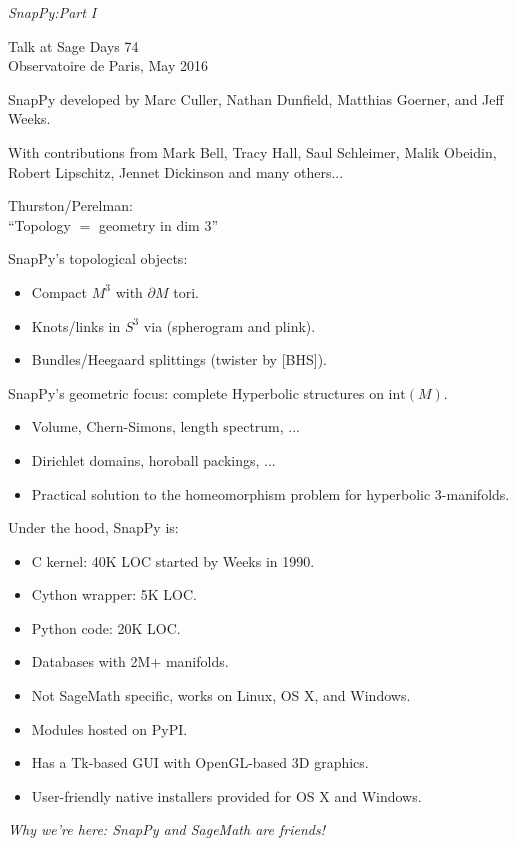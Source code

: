 \documentclass[aspect=16:10, tikz, half]{nmd/slide}
\begin{document}
\begin{frame}
  \emph{\Large SnapPy:Part I}

  Talk at Sage Days 74  \\
  Observatoire de Paris, May 2016

  \vspace{1.5cm}
  SnapPy developed by  Marc Culler, Nathan Dunfield, Matthias Goerner,
  and Jeff Weeks.  
  \vspace{0.5cm}

  With contributions from Mark Bell, Tracy Hall, Saul Schleimer, Malik
  Obeidin, Robert Lipschitz, Jennet Dickinson and many others...
 
\end{frame}


\begin{frame}
Thurston/Perelman: \\ 
``Topology $=$ geometry in dim 3''

\vspace{1cm}

SnapPy's topological objects:
\begin{itemize}
  \item Compact $M^3$ with $\partial M$ tori.  
  \item Knots/links in $S^3$ via (spherogram and plink).
  \item Bundles/Heegaard splittings (twister by [BHS]).
\end{itemize}
 
\end{frame}

\begin{frame}
  SnapPy's geometric focus: complete Hyperbolic structures on
  $\mathrm{int}(M)$.  

  \begin{itemize}
    \item Volume, Chern-Simons, length spectrum, ...
    \item Dirichlet domains, horoball packings, ...
    \item Practical solution to the homeomorphism problem for
      hyperbolic 3-manifolds. 
  \end{itemize}
\end{frame}


\begin{frame}
  Under the hood, SnapPy is:
  \begin{itemize}
  \item C kernel: 40K LOC started by Weeks in 1990. 
  \item Cython wrapper: 5K LOC.
  \item Python code: 20K LOC.
  \item Databases with 2M+ manifolds.
  \item Not SageMath specific, works on Linux, OS X, and Windows.
  \item Modules hosted on PyPI.
  \item Has a Tk-based GUI with OpenGL-based 3D graphics.
  \item User-friendly native installers provided for OS X and Windows.    
  \end{itemize}
\emph{Why we're here: SnapPy and SageMath are friends!}
\end{frame}
\end{document}
